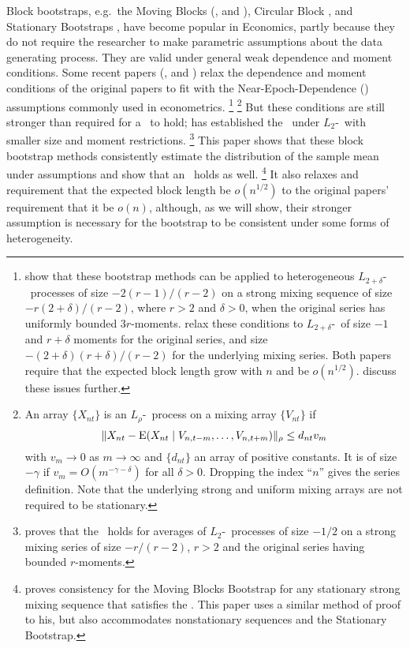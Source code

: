 \documentclass[11pt]{article}
\begin{document}
\newpage
\noindent Block bootstraps, e.g.\ the Moving Blocks
(\citealp{Kun:89}, and \citealp{LiS:92}), Circular Block \citep{PoR:92}, and Stationary
Bootstraps \citep{PoR:94}, have become popular in Economics, partly
because they do not require the researcher to make parametric
assumptions about the data generating process.  They are valid under
general weak dependence and moment conditions.  Some recent papers
(\citealp{GoW:02}, and \citealp{GoJ:03}) relax the dependence and moment
conditions of the original papers to fit with the Near-Epoch-Dependence
(\ned) assumptions commonly used in econometrics.%
\footnote{\citet{GoW:02} show that these bootstrap methods can be
  applied to heterogeneous $L_{2+\delta}$-\ned\ processes of size
  $-2(r-1)/(r-2)$ on a strong mixing sequence of size
  $-r(2+\delta)/(r-2)$, where $r > 2$ and $\delta >0$, when the
  original series has uniformly bounded $3r$-moments.  \citet{GoJ:03}
  relax these conditions to $L_{2+\delta}$-\ned\ of size $-1$ and
  $r+\delta$ moments for the original series, and size
  $-(2+\delta)(r+\delta)/(r-2)$ for the underlying mixing series.
  Both papers require that the expected block length grow with $n$ and
  be $o(n^{1/2})$.  \cite{GoP:11} discuss these issues further.}%
\footnote{An array $\{X_{nt}\}$ is an $L_{\rho}$-\ned\ process on a
  mixing array $\{V_{nt}\}$ if
  \begin{equation}
    \| X_{nt} - \operatorname{E}(X_{nt}
    \mid V_{n,t-m},\dots,V_{n,t+m}) \|_{\rho} \leq d_{nt} v_m
  \end{equation}
  with $v_m \to 0$ as $m \to \infty$ and $\{d_{nt}\}$ an array of
  positive constants.  It is of size $-\gamma$ if $v_m = O(m^{-\gamma
    - \delta})$ for all $\delta>0$.  Dropping the index ``$n$'' gives
  the series definition.  Note that the underlying strong and uniform mixing arrays
  are not required to be stationary.} %
But these conditions are still stronger than
required for a \clt\ to hold; \citet{Jon:97} has established the \clt\
under $L_2$-\ned\ with smaller size and moment
restrictions.%
\footnote{\citet{Jon:97} proves that the \clt\ holds for averages of
  $L_2$-\ned\ processes of size $-1/2$ on a strong mixing series of
  size $-r/(r-2)$, $r > 2$ and the original series having bounded
  $r$-moments.} %
This paper shows that these block bootstrap
methods consistently estimate the distribution of the sample mean
under \citepos{Jon:97} assumptions and show that an \fclt\ holds as
well.%
\footnote{\citet{Rad:96} proves consistency for the Moving Blocks
  Bootstrap for any stationary strong mixing sequence that satisfies
  the \clt. This paper uses a similar method of proof to his, but also
  accommodates nonstationary sequences and the Stationary
  Bootstrap.} %
It also relaxes  and  requirement that
the expected block length be $o(n^{1/2})$ to the original papers'
requirement that it be $o(n)$, although, as we will show, their
stronger assumption is necessary for the bootstrap to be consistent
under some forms of heterogeneity.
\end{document}
